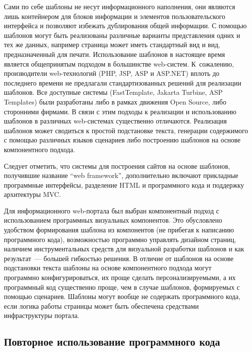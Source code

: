 \begin{multicols}{2}
 Сами по себе шаблоны не несут информационного наполнения, они являются лишь
контейнером для блоков информации и элементов пользовательского интерфейса и
позволяют избежать дублирования общей информации. С помощью шаблонов могут быть
реализованы различные варианты представления одних и тех же данных, например
страница может иметь стандартный вид и вид, предназначенный для печати.
Использование шаблонов в\linebreak 
насто\-я\-щее время является общепринятым подходом в
большинстве web-сис\-тем. К~со\-жа\-ле\-нию, производители web-технологий
(PHP, JSP, ASP и
ASP.NET) вплоть до последнего времени не предлагали стандартизованных решений для
реализации шаблонов. Все доступные системы (FastTemplate, Jakarta Turbine, ASP
Templates) были разработаны либо в рамках движения Open Source, либо сторонними
фирмами. В связи с этим подходы к реализации и использованию шаблонов в различных
web-сис\-те\-мах существенно отличаются. Реализация %
шаб\-ло\-нов может сводиться к простой
подстановке текста, генерации содержимого с по\-мощью различных языков сценариев
либо построению шаб\-ло\-нов на основе компонентного подхода.

 Следует отметить, что системы для построения сайтов на основе шаблонов,
получившие название ``web framework'', дополнительно включают прикладные
программные интерфейсы, разделение HTML и программного кода и поддержку
архитектуры MVC.

 Для информационного web-портала был выбран компонентный подход с
использованием програм\-мных визуальных компонентов. Это обуслов\-ле\-но удобством
формирования шаблона из ком\-по\-нен\-тов (не прибегая к написанию про\-грам\-мно\-го кода),
возможностью программно управлять дизайном страниц, наличием инструментальных
средств для визу\-аль\-ной разработки шаблонов и как результат~--- большей гибкостью
решения. В отличие от шаб\-ло\-нов на основе подстановки текста шаблоны на основе
компонентного подхода могут про\-грам\-мно конфигурироваться, их проще сделать
персонализируемыми, а их программный код существенно проще, чем в случае шаблонов,
формируемых с помощью сценариев. Шаблоны могут вообще не содержать программного
кода, если логика работы страницы может быть обеспечена средствами инфраструктуры
портала.

\subsection{Повторное использование программного кода} %


\end{multicols}
